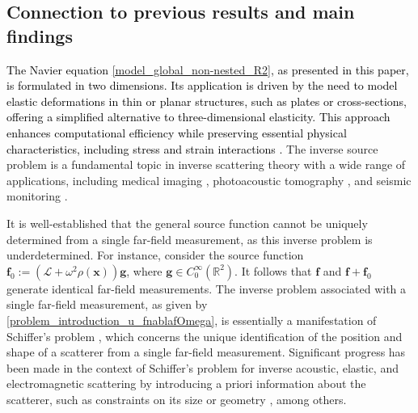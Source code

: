 \documentclass[11pt,reqno,oneside]{amsart}
\theoremstyle{definition}
\theoremstyle{remark}
\numberwithin{equation}{section}
\numberwithin{equation}{section}
\theoremstyle{remark}
\begin{document}
\subsection{Connection to previous results and main findings}

\textcolor{black}{The Navier equation \eqref{model_global_non-nested_R2}, as presented in this paper, is formulated in two dimensions. Its application is driven by the need to model elastic deformations in thin or planar structures, such as plates or cross-sections, offering a simplified alternative to three-dimensional elasticity. This approach enhances computational efficiency while preserving essential physical characteristics, including stress and strain interactions \cite{reddy2006theory, virieux2009overview}.} The inverse source problem is a fundamental topic in inverse scattering theory with a wide range of applications, including medical imaging \cite{hashmi2020optical}, photoacoustic tomography \cite{arridge1999optical}, and seismic monitoring \cite{alves2014identification, ammari2013time, song2011full}. 

It is well-established that the general source function cannot be uniquely determined from a single far-field measurement, as this inverse problem is underdetermined. For instance, consider the source function $ \mathbf{f}_0 := \left(\mathcal{L} + \omega^2 \rho(\mathbf{x})\right)\mathbf{g} $, where $ \mathbf{g} \in C^{\infty}_0 \left(\mathbb{R}^2\right) $. It follows that $ \mathbf{f} $ and $ \mathbf{f} + \mathbf{f}_0 $ generate identical far-field measurements. The inverse problem associated with a single far-field measurement, as given by \eqref{problem_introduction_u_fnablafOmega}, is essentially a manifestation of Schiffer's problem \cite{bleistein1977nonuniqueness, colton2018looking, colton2019inverse}, which concerns the unique identification of the position and shape of a scatterer from a single far-field measurement. Significant progress has been made in the context of Schiffer’s problem for inverse acoustic, elastic, and electromagnetic scattering by introducing a priori information about the scatterer, such as constraints on its size or geometry \cite{colton2018looking, colton2019inverse}, among others.
\end{document}
